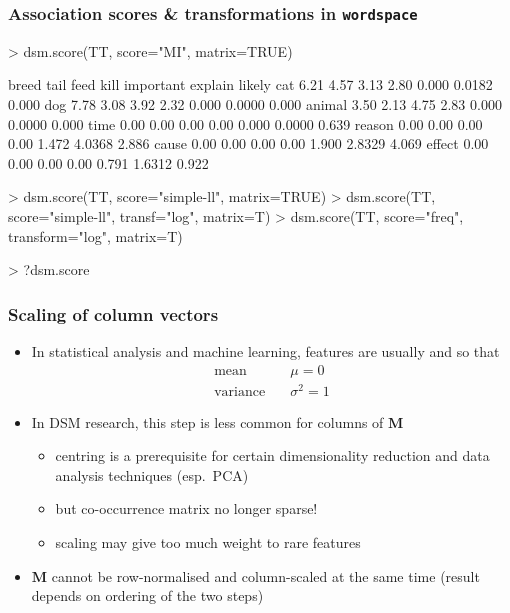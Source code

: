\documentclass[t]{beamer} %
\begin{document}
\begin{frame}[fragile]
  \frametitle{Association scores \& transformations in \texttt{wordspace}}

\ungap[1]
\begin{Rcode}
> dsm.score(TT, score="MI", matrix=TRUE) \begin{Rout}
       breed tail feed kill important explain likely
cat     6.21 4.57 3.13 2.80     0.000  0.0182  0.000
dog     7.78 3.08 3.92 2.32     0.000  0.0000  0.000
animal  3.50 2.13 4.75 2.83     0.000  0.0000  0.000
time    0.00 0.00 0.00 0.00     0.000  0.0000  0.639
reason  0.00 0.00 0.00 0.00     1.472  4.0368  2.886
cause   0.00 0.00 0.00 0.00     1.900  2.8329  4.069
effect  0.00 0.00 0.00 0.00     0.791  1.6312  0.922
\end{Rout}
> dsm.score(TT, score="simple-ll", matrix=TRUE)
> dsm.score(TT, score="simple-ll", transf="log", matrix=T)
> dsm.score(TT, score="freq", transform="log", matrix=T)

> ?dsm.score 
\end{Rcode}
\end{frame}


\begin{frame}
  \frametitle{Scaling of column vectors}

  \begin{itemize}
  \item In statistical analysis and machine learning, features are
    usually  and  so that
    \begin{align*}
      \text{mean} & \quad \mu = 0 \\
      \text{variance} & \quad \sigma^2 = 1
    \end{align*}
  \item<2-> In DSM research, this step is less common for columns of $\mathbf{M}$
    \begin{itemize}
    \item centring is a prerequisite for certain dimensionality
      reduction and data analysis techniques (esp.\ PCA)
    \item but co-occurrence matrix no longer sparse!
    \item scaling may give too much weight to rare features
    \end{itemize}
  \item<3-> $\mathbf{M}$ cannot be row-normalised and column-scaled at the
    same time (result depends on ordering of the two steps)
  \end{itemize}
\end{frame}
\end{document}
